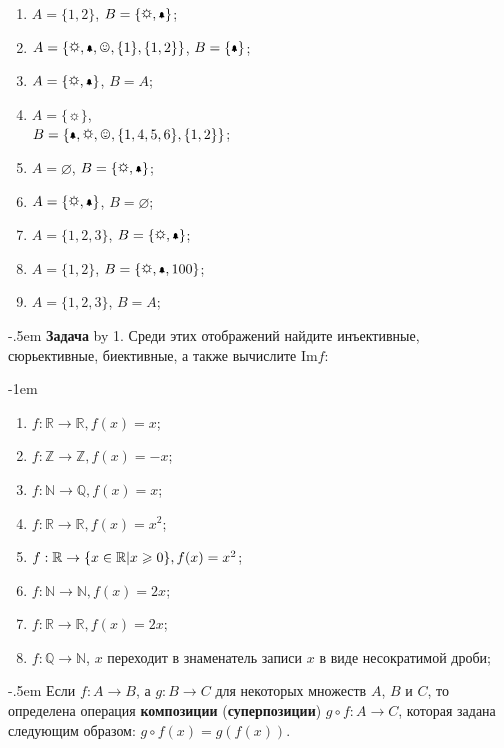 \documentclass[a4paper,10pt]{article}
\def\problem{\textbf{Задача \the\problemnum}\advance\problemnum by 1}
\begin{document}
{\begin{multicols}{3}
	\begin{enumerate}[label=(\arabic*)\,]
		\item $A=\{1,2\}$, $B=\{\sun,\bell\}$;
		\item $A=\{\sun,\bell,\smiley, \{1\}, \{1,2\}\}$, $B=\{\bell\}$;
		\item $A=\{\sun,\bell\}$, $B=A$;
		\item $A=\{\sun\}$,\\ $B=\{\bell,\sun,\smiley, \{1,4,5,6\}, \{1,2\}\}$;
		\item $A=\varnothing$, $B=\{\sun,\bell\}$;
		\item $A=\{\sun,\bell\}$, $B=\varnothing$;
		\item $A=\{1,2,3\}$, $B=\{\sun,\bell\}$;
		\item $A=\{1,2\}$, $B=\{\sun,\bell,100\}$;
		\item $A=\{1,2,3\}$, $B=A$;
	\end{enumerate}
\end{multicols}
\par\kern-.5em
\problem. Среди этих отображений найдите инъективные, сюрьективные, биективные, а также вычислите $\mathrm{Im} f$: \par\kern-1em
\begin{multicols}{3}
	\begin{enumerate}[label=(\arabic*)\,]
		\item $f:\mathbb R\to\mathbb R, f(x)=x$;
		\item $f:\mathbb Z\to\mathbb Z, f(x)=-x$;
		\item $f:\mathbb N\to\mathbb Q, f(x)=x$;
		\item $f:\mathbb R\to\mathbb R, f(x)=x^2$;
		\item $f:\mathbb R\to\mathbb \{x\in\mathbb R|x\geqslant 0\}, f(x)=x^2$;
		\item $f:\mathbb N\to\mathbb N, f(x)=2x$;
		\item $f:\mathbb R\to\mathbb R, f(x)=2x$;
		\item $f:\mathbb Q\to\mathbb N$, $x$ переходит в знаменатель записи $x$ в виде несократимой дроби;
	\end{enumerate}
\end{multicols}
\par\kern-.5em
Если $f:A\to B$, а $g: B\to C$ для некоторых множеств $A$, $B$ и $C$, то определена операция \textbf{композиции} (\textbf{суперпозиции}) $g\circ f: A\to C$, которая задана следующим образом: $g\circ f(x) = g(f(x))$.

}
\end{document}
